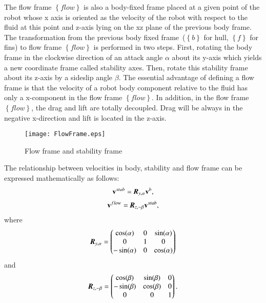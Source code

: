 The flow frame $\left\{ flow \right\}$ is also a body-fixed frame placed at a given point of the robot whose x axis is oriented as the velocity of the robot with respect to the fluid at this point and z-axis lying on the xz plane of the previous body frame. The transformation from the previous body fixed frame~($\left\{ b \right\}$ for hull, $\left\{ f \right\}$ for fins) to flow frame $\left\{ flow \right\}$ is performed in two steps. First, rotating the body frame in the clockwise direction of an attack angle $\alpha$ about its y-axis which yields a new coordinate frame called stability axes. Then, rotate this stability frame about its z-axis by a sideslip angle $\beta$. The essential advantage of defining a flow frame is 
that the velocity of a robot body component relative to the fluid has only a x-component in the flow frame $\left\{ flow \right\}$. In addition, in the flow frame $\left\{ flow \right\}$, the drag and lift are totally decoupled. Drag will be always in the negative x-direction and lift is located in the z-axis.
\begin{figure}
\centering
\texttt{[image: FlowFrame.eps]}
\caption{Flow frame and stability frame}	
\label{FIG:FlowFrame}
\end{figure}

The relationship between velocities in body, stability and flow frame can be expressed mathematically as follows:
\begin{align}
\vec{v}^{stab}=\emph{\textbf{R}}_{y,\alpha}\vec{v}^{b},
\end{align}
\begin{align}
\vec{v}^{flow}=\emph{\textbf{R}}_{z,-\beta}\vec{v}^{stab},
\end{align}
where 
\begin{align}
\emph{\textbf{R}}_{y,\alpha}=
\begin{pmatrix}
\cos(\alpha)&0&\sin(\alpha)\\
0&1&0\\
-\sin(\alpha)&0&\cos(\alpha)
\end{pmatrix}
\end{align}
and
\begin{align}
\emph{\textbf{R}}_{z,-\beta}=
\begin{pmatrix}
\cos(\beta)&\sin(\beta)&0\\
-\sin(\beta)&\cos(\beta)&0\\
0&0&1
\end{pmatrix}. \label{EQ:sp3}
\end{align}


